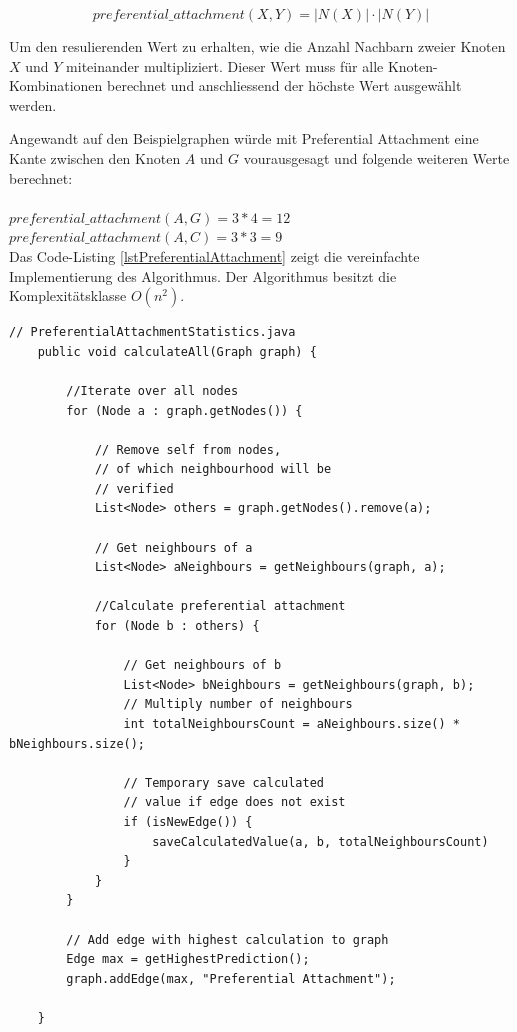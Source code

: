 \begin{equation}
    \label{eq:pa}
    preferential\_attachment(X,Y) = | N(X) | \cdot | N(Y ) |
\end{equation}

Um den resulierenden Wert zu erhalten, wie die Anzahl Nachbarn zweier Knoten $X$ und $Y$ miteinander multipliziert. Dieser Wert muss für alle Knoten-Kombinationen berechnet und anschliessend der höchste Wert
ausgewählt werden.

Angewandt auf den Beispielgraphen würde mit Preferential Attachment eine Kante zwischen den Knoten $A$ und $G$ vourausgesagt und folgende weiteren Werte berechnet:\\
\\
\vspace{4mm}
\forceindent $preferential\_attachment(A,G) = 3 * 4 = 12$\\
\vspace{4mm}
\forceindent $preferential\_attachment(A,C) = 3 * 3 = 9$\\

Das Code-Listing \ref{lstPreferentialAttachment} zeigt die vereinfachte Implementierung des Algorithmus. Der Algorithmus besitzt die Komplexitätsklasse $O(n^2)$.

\begin{lstlisting}[caption={Preferential attachment implementation},label=lstPreferentialAttachment]
    // PreferentialAttachmentStatistics.java
    public void calculateAll(Graph graph) {

        //Iterate over all nodes
        for (Node a : graph.getNodes()) {

            // Remove self from nodes,
            // of which neighbourhood will be
            // verified
            List<Node> others = graph.getNodes().remove(a);

            // Get neighbours of a
            List<Node> aNeighbours = getNeighbours(graph, a);

            //Calculate preferential attachment
            for (Node b : others) {

                // Get neighbours of b
                List<Node> bNeighbours = getNeighbours(graph, b);
                // Multiply number of neighbours
                int totalNeighboursCount = aNeighbours.size() * bNeighbours.size();

                // Temporary save calculated
                // value if edge does not exist
                if (isNewEdge()) {
                    saveCalculatedValue(a, b, totalNeighboursCount)
                }
            }
        }

        // Add edge with highest calculation to graph
        Edge max = getHighestPrediction();
        graph.addEdge(max, "Preferential Attachment");

    }
\end{lstlisting}


